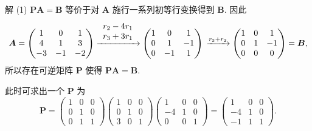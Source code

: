\documentclass[../../main.tex]{subfiles}%
\begin{document}
\begin{solution}
解 (1) $\boldsymbol{PA} = \boldsymbol{B}$ 等价于对 $\boldsymbol{A}$ 施行一系列初等行变换得到 $\boldsymbol{B}$. 因此
\[
\boldsymbol{A} = \begin{pmatrix} 
1 & 0 & 1 \\
4 & 1 & 3 \\
-3 & -1 & -2 
\end{pmatrix} \xrightarrow{\begin{array}{c}
r_2-4r_1\\
r_3+3r_1\\
\end{array}}\begin{pmatrix} 
1 & 0 & 1 \\
0 & 1 & -1 \\
0 & -1 & 1 
\end{pmatrix} \\
\xrightarrow{r_3 + r_2} \begin{pmatrix} 
1 & 0 & 1 \\
0 & 1 & -1 \\
0 & 0 & 0 
\end{pmatrix} = \boldsymbol{B},
\]
所以存在可逆矩阵 $\boldsymbol{P}$ 使得 $\boldsymbol{PA} = \boldsymbol{B}$.

此时可求出一个 $\boldsymbol{P}$ 为
\[
\boldsymbol{P} = \begin{pmatrix} 
1 & 0 & 0 \\
0 & 1 & 0 \\
0 & 1 & 1 
\end{pmatrix} \begin{pmatrix} 
1 & 0 & 0 \\
0 & 1 & 0 \\
3 & 0 & 1 
\end{pmatrix} \begin{pmatrix} 
1 & 0 & 0 \\
-4 & 1 & 0 \\
0 & 0 & 1 
\end{pmatrix} = \begin{pmatrix} 
1 & 0 & 0 \\
-4 & 1 & 0 \\
-1 & 1 & 1 
\end{pmatrix}.
\]


\end{solution}
\end{document}

